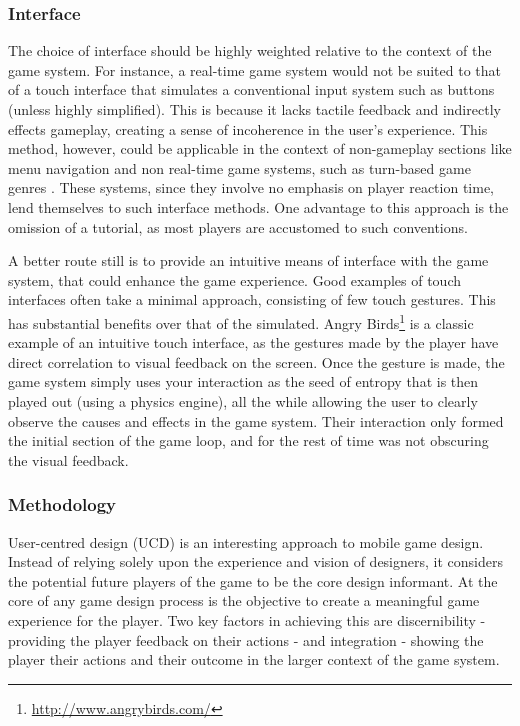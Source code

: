 \documentclass[final]{cmpreport}
\begin{document}
\subsubsection{Interface}
The choice of interface should be highly weighted relative to the context of the game system. For instance, a real-time game system would not be suited to that of a touch interface that simulates a conventional input system such as buttons (unless highly simplified). This is because it lacks tactile feedback and indirectly effects gameplay, creating a sense of incoherence in the user's experience. This method, however, could be applicable in the context of non-gameplay sections like menu navigation and non real-time game systems, such as turn-based game genres \cite{XuBradburn}. These systems, since they  involve no emphasis on player reaction time, lend themselves to such interface methods. One advantage to this approach is the omission of a tutorial, as most players are accustomed to such conventions.

A better route still is to provide an intuitive means of interface with the game system, that could enhance the game experience. Good examples of touch interfaces often take a minimal approach, consisting of few touch gestures. This has substantial benefits over that of the simulated. Angry Birds\footnote{\url{http://www.angrybirds.com/}} is a classic example of an intuitive touch interface, as the gestures made by the player have direct correlation to visual feedback on the screen. Once the gesture is made, the game system simply uses your interaction as the seed of entropy that is then played out (using a physics engine), all the while allowing the user to clearly observe the causes and effects in the game system. Their interaction only formed the initial section of the game loop, and for the rest of time was not obscuring the visual feedback.

\subsubsection{Methodology}
User-centred design (UCD) is an interesting approach to mobile game design. Instead of relying solely upon the experience and vision of designers, it considers the potential future players of the game to be the core design informant. At the core of any game design process is the objective to create a meaningful game experience for the player. Two key factors in achieving this are discernibility - providing the player feedback on their actions - and integration - showing the player their actions and their outcome in the larger context of the game system.
\end{document}

